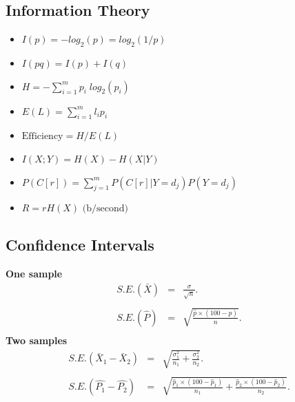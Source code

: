 \documentclass[a4paper,12pt]{article}
\begin{document}
\subsection*{Information Theory}

\begin{itemize}
\item $I(p) = - log_{2}(p) = log_{2}(1/p)$\\

\item $I(pq) = I(p) + I(q)$\\

\item $H = - \sum_{i=1}^{m}p_{i}\; log_{2}(p_{i})$\\

\item $E(L) = \sum_{i=1}^{m} l_{i} p_{i}$\\

\item $\mbox{Efficiency} = H / E(L)$\\

\item $I(X;Y) = H(X) - H(X|Y)$\\

\item $P(C[r]) = \sum_{j=1}^{m}P(C[r]|Y=d_{j} )P(Y=d_{j} )$

\item $R = rH(X) \mbox{      (b/second)}$
\end{itemize}

\newpage
\subsection*{Confidence Intervals}
{\bf One sample}
\begin{eqnarray*} S.E.(\bar{X})&=&\frac{\sigma}{\sqrt{n}}.\\\\
S.E.(\hat{P})&=&\sqrt{\frac{\hat{p}\times(100-\hat{p})}{n}}.\\
\end{eqnarray*}
{\bf Two samples}
\begin{eqnarray*}
S.E.(\bar{X}_1-\bar{X}_2)&=&\sqrt{\frac{\sigma^2_1}{n_1}+\frac{\sigma_2^2}{n_2}}.\\\\
S.E.(\hat{P_1}-\hat{P_2})&=&\sqrt{\frac{\hat{p}_1\times(100-\hat{p}_1)}{n_1}+\frac{\hat{p}_2\times(100-\hat{p}_2)}{n_2}}.\\\\
\end{eqnarray*}
\end{document}

